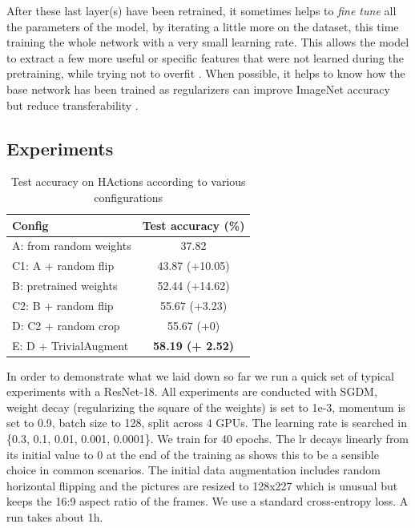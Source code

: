 After these last layer(s) have been retrained, it sometimes helps to \emph{fine tune} all the parameters of the model, by iterating a little more on the dataset, this time training the whole network with a very small learning rate. This allows the model to extract a few more useful or specific features that were not learned during the pretraining, while trying not to overfit . When possible, it helps to know how the base network has been trained as regularizers can improve ImageNet accuracy but reduce transferability \citep{imagenettransfer,crossentropytransfer}.

\subsection{Experiments}

\begin{table}[]
    \centering
    \begin{tabular}{|l|c|}
    \hline
        \textbf{Config} & \textbf{Test accuracy (\%)} \\
    \hline
        A: from random weights & 37.82 \\
    \hline
        C1: A + random flip & 43.87 (+10.05)\\
    \hline
        B: pretrained weights & 52.44 (+14.62) \\
    \hline
        C2: B + random flip & 55.67 (+3.23) \\
    \hline
        D: C2 + random crop & 55.67 (+0) \\
    \hline
        E: D + TrivialAugment & \textbf{58.19 (+ 2.52)} \\
    \hline
    \end{tabular}
    \caption{Test accuracy on HActions according to various configurations}
    \label{tab:hactivity_results}
\end{table}

In order to demonstrate what we laid down so far we run a quick set of typical experiments with a ResNet-18. All experiments are conducted with SGDM, weight decay (regularizing the square of the weights) is set to 1e-3, momentum is set to 0.9, batch size to 128, split across 4 GPUs. The learning rate is searched in \{0.3, 0.1, 0.01, 0.001, 0.0001\}. We train for 40 epochs. The \ac{lr} decays linearly from its initial value to 0 at the end of the training as \citep{lineardecay} shows this to be a sensible choice in common scenarios. The initial data augmentation includes random horizontal flipping and the pictures are resized to 128x227 which is unusual but keeps the 16:9 aspect ratio of the frames. We use a standard cross-entropy loss. A run takes about 1h.

